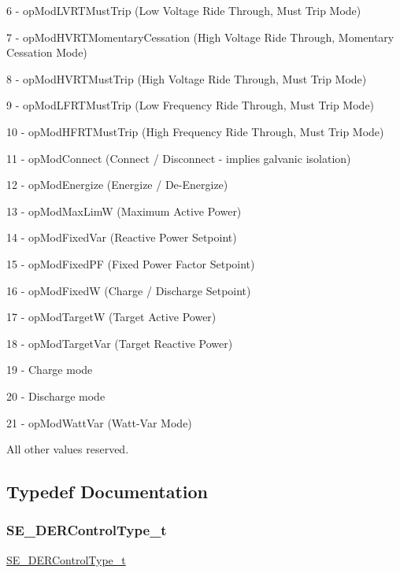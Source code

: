 6 -\/ op\+Mod\+L\+V\+R\+T\+Must\+Trip (Low Voltage Ride Through, Must Trip Mode)

7 -\/ op\+Mod\+H\+V\+R\+T\+Momentary\+Cessation (High Voltage Ride Through, Momentary Cessation Mode)

8 -\/ op\+Mod\+H\+V\+R\+T\+Must\+Trip (High Voltage Ride Through, Must Trip Mode)

9 -\/ op\+Mod\+L\+F\+R\+T\+Must\+Trip (Low Frequency Ride Through, Must Trip Mode)

10 -\/ op\+Mod\+H\+F\+R\+T\+Must\+Trip (High Frequency Ride Through, Must Trip Mode)

11 -\/ op\+Mod\+Connect (Connect / Disconnect -\/ implies galvanic isolation)

12 -\/ op\+Mod\+Energize (Energize / De-\/\+Energize)

13 -\/ op\+Mod\+Max\+LimW (Maximum Active Power)

14 -\/ op\+Mod\+Fixed\+Var (Reactive Power Setpoint)

15 -\/ op\+Mod\+Fixed\+PF (Fixed Power Factor Setpoint)

16 -\/ op\+Mod\+FixedW (Charge / Discharge Setpoint)

17 -\/ op\+Mod\+TargetW (Target Active Power)

18 -\/ op\+Mod\+Target\+Var (Target Reactive Power)

19 -\/ Charge mode

20 -\/ Discharge mode

21 -\/ op\+Mod\+Watt\+Var (Watt-\/\+Var Mode)

All other values reserved. 

\subsection{Typedef Documentation}
\mbox{\label{group__DERControlType_gae0eefcd49e1cd98d709327c88f20a76b}} 
\subsubsection{\texorpdfstring{S\+E\+\_\+\+D\+E\+R\+Control\+Type\+\_\+t}{SE\_DERControlType\_t}}
{\footnotesize\ttfamily \hyperlink{group__DERControlType_gae0eefcd49e1cd98d709327c88f20a76b}{S\+E\+\_\+\+D\+E\+R\+Control\+Type\+\_\+t}}

